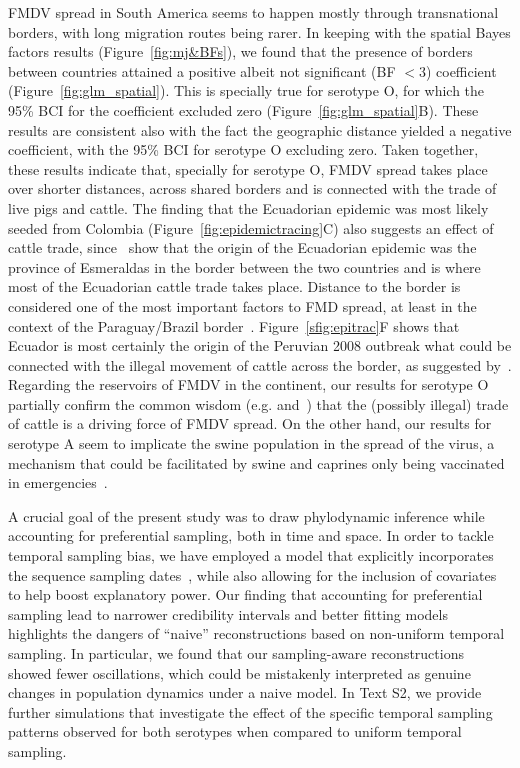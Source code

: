 \documentclass[10pt]{article}
\begin{document}
FMDV spread in South America seems to happen mostly through transnational borders, with long migration routes being rarer.
In keeping with the spatial Bayes factors results (Figure~\ref{fig:mj&BFs}), we found that the presence of borders between countries attained a positive albeit not significant (BF $<3$) coefficient (Figure~\ref{fig:glm_spatial}).
This is specially true for serotype O, for which the 95\% BCI for the coefficient excluded zero (Figure~\ref{fig:glm_spatial}B).
These results are consistent also with the fact the geographic distance yielded a negative coefficient, with the 95\% BCI for serotype O excluding zero.
Taken together, these results indicate that, specially for serotype O, FMDV spread takes place over shorter distances, across shared borders and is connected with the trade of live pigs and cattle.
The finding that the Ecuadorian epidemic was most likely seeded from Colombia (Figure~\ref{fig:epidemictracing}C) also suggests an effect of cattle trade, since~\cite{Carvalho2013} show that the origin of the Ecuadorian epidemic was the province of Esmeraldas in the border between the two countries and is where most of the Ecuadorian cattle trade takes place. 
Distance to the border is considered one of the most important factors to FMD spread, at least in the context of the Paraguay/Brazil border~\citep{Amaral2016}.
Figure~\ref{sfig:epitrac}F shows that Ecuador is most certainly the origin of the Peruvian 2008 outbreak what could be connected with the illegal movement of cattle across the border, as suggested by~\cite{Correa2002}.
Regarding the reservoirs of FMDV in the continent, our results for serotype O partially confirm the common wisdom (e.g.\citep{Saraiva2003} and~\citep{Naranjo2013}) that the (possibly illegal) trade of cattle is a driving force of FMDV spread.
On the other hand, our results for serotype A seem to implicate the swine population in the spread of the virus, a mechanism that could be facilitated by swine and caprines only being vaccinated in emergencies~\citep{Saraiva2003}.


A crucial goal of the present study was to draw phylodynamic inference while accounting for preferential sampling, both in time and space.
In order to tackle temporal sampling bias, we have employed a model that explicitly incorporates the sequence sampling dates~\citep{Karcher2019}, while also allowing for the inclusion of covariates to help boost explanatory power.
Our finding that accounting for preferential sampling lead to narrower credibility intervals and better fitting models highlights the dangers of ``naive'' reconstructions based on non-uniform temporal sampling.
In particular, we found that our sampling-aware reconstructions showed fewer oscillations, which could be mistakenly interpreted as genuine changes in population dynamics under a naive model. 
In Text S2, we provide further simulations that investigate the effect of the specific temporal sampling patterns observed for both serotypes when compared to uniform temporal sampling.
\end{document}
